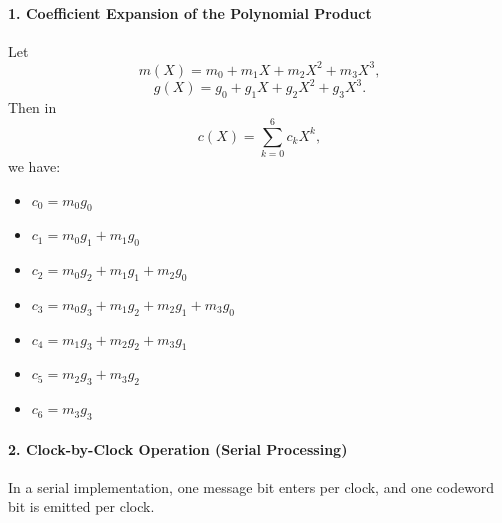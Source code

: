 \documentclass[
]{article}
\providecommand{\tightlist}{%
  \setlength{\itemsep}{0pt}\setlength{\parskip}{0pt}}
\begin{document}
\paragraph{1. Coefficient Expansion of the Polynomial
Product}\label{coefficient-expansion-of-the-polynomial-product}

Let \[m(X)=m_0+m_1X+m_2X^2+m_3X^3,\] \[g(X)=g_0+g_1X+g_2X^2+g_3X^3.\]
Then in \[c(X)=\sum_{k=0}^{6} c_k X^k,\] we have:

\begin{itemize}
\tightlist
\item
  \(c_0 = m_0 g_0\)
\item
  \(c_1 = m_0 g_1 + m_1 g_0\)
\item
  \(c_2 = m_0 g_2 + m_1 g_1 + m_2 g_0\)
\item
  \(c_3 = m_0 g_3 + m_1 g_2 + m_2 g_1 + m_3 g_0\)
\item
  \(c_4 = m_1 g_3 + m_2 g_2 + m_3 g_1\)
\item
  \(c_5 = m_2 g_3 + m_3 g_2\)
\item
  \(c_6 = m_3 g_3\)
\end{itemize}

\paragraph{2. Clock-by-Clock Operation (Serial
Processing)}\label{clock-by-clock-operation-serial-processing}

In a serial implementation, one message bit enters per clock, and one
codeword bit is emitted per clock.
\end{document}
